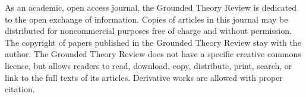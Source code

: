 As an academic, open access journal,
the Grounded Theory Review is dedicated to the open exchange of information.
Copies of articles in this journal may be distributed for noncommercial purposes
free of charge and without permission.
The copyright of papers published in the Grounded Theory Review stay with the author.
The Grounded Theory Review does not have a specific creative commons license,
but allows readers to read, download, copy, distribute, print, search,
or link to the full texts of its articles.  Derivative works are allowed with proper citation.


\nocite{article.cynthia10}
\nocite{article.lowe97}
\nocite{article.morse95}
\nocite{book.creswell98}
\nocite{book.glaser65}
\nocite{book.glaser67}
\nocite{book.glaser78}
\nocite{book.glaser92}
\nocite{book.glaser93}
\nocite{book.glaser94}
\nocite{book.glaser95}
\nocite{book.glaser98a}
\nocite{book.glaser98b}
\nocite{incollection.may94}
\nocite{incollection.morse94}





